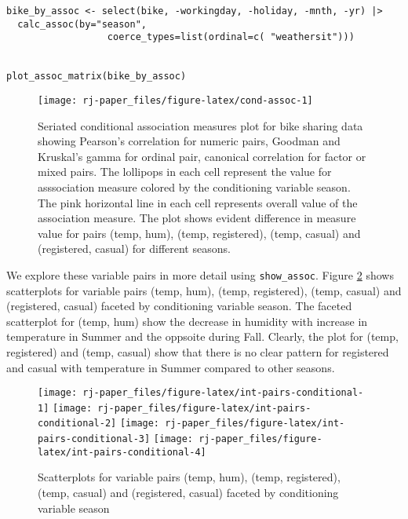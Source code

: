 \begin{verbatim}
bike_by_assoc <- select(bike, -workingday, -holiday, -mnth, -yr) |>
  calc_assoc(by="season", 
                  coerce_types=list(ordinal=c( "weathersit")))


plot_assoc_matrix(bike_by_assoc)
\end{verbatim}

\begin{figure}

{\centering \texttt{[image: rj-paper\_files/figure-latex/cond-assoc-1]} 

}

\caption{Seriated conditional association measures plot for bike sharing data showing Pearson's correlation for numeric pairs, Goodman and Kruskal's gamma for ordinal pair, canonical correlation for factor or mixed pairs. The lollipops in each cell represent the value for asssociation measure colored by the conditioning variable season. The pink horizontal line in each cell represents overall value of the association measure. The plot shows evident difference in measure value for pairs (temp, hum), (temp, registered), (temp, casual) and (registered, casual) for different seasons.}\label{fig:cond-assoc}
\end{figure}

We explore these variable pairs in more detail using \texttt{show\_assoc}. Figure \ref{fig:int-pairs-conditional} shows scatterplots for variable pairs (temp, hum), (temp, registered), (temp, casual) and (registered, casual) faceted by conditioning variable season. The faceted scatterplot for (temp, hum) show the decrease in humidity with increase in temperature in Summer and the oppsoite during Fall. Clearly, the plot for (temp, registered) and (temp, casual) show that there is no clear pattern for registered and casual with temperature in Summer compared to other seasons.

\begin{figure}
\texttt{[image: rj-paper\_files/figure-latex/int-pairs-conditional-1]} \texttt{[image: rj-paper\_files/figure-latex/int-pairs-conditional-2]} \texttt{[image: rj-paper\_files/figure-latex/int-pairs-conditional-3]} \texttt{[image: rj-paper\_files/figure-latex/int-pairs-conditional-4]} \caption{Scatterplots for variable pairs (temp, hum), (temp, registered), (temp, casual) and (registered, casual) faceted by conditioning variable season}\label{fig:int-pairs-conditional}
\end{figure}

